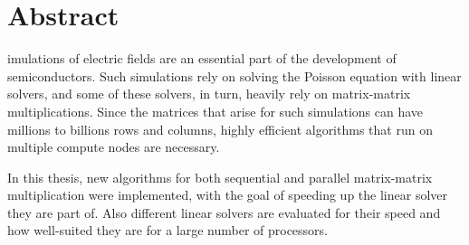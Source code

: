 %
%
%

\chapter*{Abstract}
\begin{SingleSpace}

imulations of electric fields are an essential part of the development of semiconductors. Such simulations rely on solving the Poisson equation with linear solvers, and some of these solvers, in turn, heavily rely on matrix-matrix multiplications. Since the matrices that arise for such simulations can have millions to billions rows and columns, highly efficient algorithms that run on multiple compute nodes are necessary. 

In this thesis, new algorithms for both sequential and parallel matrix-matrix multiplication were implemented, with the goal of speeding up the linear solver they are part of. Also different linear solvers are evaluated for their speed and how well-suited they are for a large number of processors.

\end{SingleSpace}
\clearpage